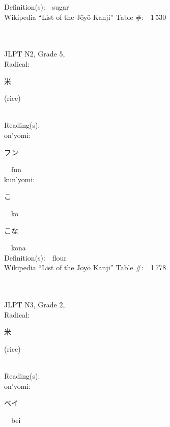 \begin{multicols}{2}
Definition(s):\ \ sugar \\
Wikipedia ``List of the J\=oy\=o Kanji'' Table \#:\ \ 1\,530 \\
\ \ \\
{\fontsize{34pt}{40pt}  }\ \ \\  %
{JLPT N2, Grade 5, \\Radical:\ \ {\begin{CJK}{UTF8}{min} 米 \end{CJK}} (rice) } \\
Reading(s):\ \ \\
{\hspace*{1em}}on'yomi:\ \ \\
{\hspace*{2em}}{\begin{CJK}{UTF8}{min} フン \end{CJK}}\ \ fun\ \ \\
{\hspace*{1em}}kun'yomi:\ \ \\
{\hspace*{2em}}{\begin{CJK}{UTF8}{min} こ \end{CJK}}\ \ ko\ \ \\
{\hspace*{2em}}{\begin{CJK}{UTF8}{min} こな \end{CJK}}\ \ kona\ \ \\
Definition(s):\ \ flour \\
Wikipedia ``List of the J\=oy\=o Kanji'' Table \#:\ \ 1\,778 \\
\ \ \\
{\fontsize{34pt}{40pt}  }\ \ \\  %
{JLPT N3, Grade 2, \\Radical:\ \ {\begin{CJK}{UTF8}{min} 米 \end{CJK}} (rice) } \\
Reading(s):\ \ \\
{\hspace*{1em}}on'yomi:\ \ \\
{\hspace*{2em}}{\begin{CJK}{UTF8}{min} ベイ \end{CJK}}\ \ bei\ \ \\

\end{multicols}
